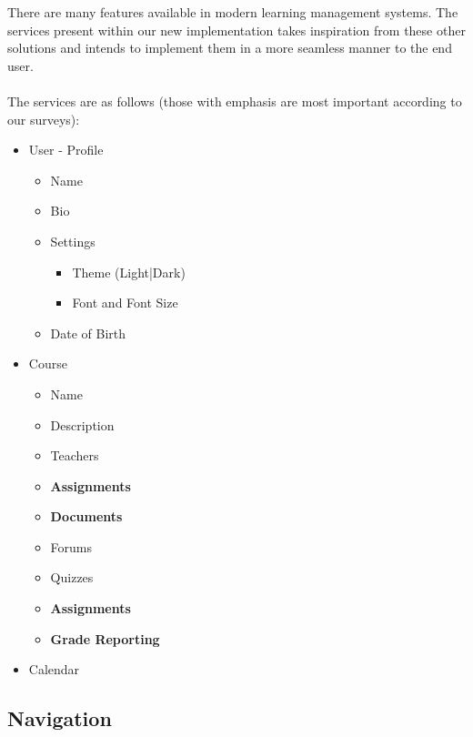 \documentclass[12pt]{article}
\begin{document}
    There are many features available in modern learning management systems.
    The services present within our new implementation takes inspiration from these other solutions and intends to implement them in a more seamless manner to the end user.

    \paragraph{}
    The services are as follows (those with emphasis are most important according to our surveys):
    \begin{itemize}
        \item User - Profile
        \begin{itemize}
            \item Name
            \item Bio
            \item Settings
            \begin{itemize}
                \item Theme (Light|Dark)
                \item Font and Font Size
            \end{itemize}
            \item Date of Birth
        \end{itemize}
        \item Course
        \begin{itemize}
            \item Name
            \item Description
            \item Teachers
            \item \textbf{Assignments}
            \item \textbf{Documents}
            \item Forums
            \item Quizzes
            \item \textbf{Assignments}
            \item \textbf{Grade Reporting}
        \end{itemize}
        \item Calendar
    \end{itemize}

    \subsection{Navigation}\label{subsec:navigation}
\end{document}
